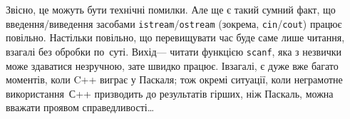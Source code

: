 Звісно, це можуть бути технічні помилки. Але ще є такий сумний факт, що введення/\nolinebreak[2]виведення засобами \texttt{istream}/\nolinebreak[2]\texttt{ostream} (зокрема, \texttt{cin}/\nolinebreak[2]\texttt{cout}) працює повільно. Настільки повільно, що перевищувати час буде саме лише читання, взагалі без обробки по~суті. Вихід\nolinebreak[3] --- читати функцією \texttt{scanf}, яка з незвички може здаватися незруч\-ною, зате швидко працює. І\nolinebreak[3] взагалі, є дуже вже багато моментів, коли C++ виграє у Паскаля; тож окремі ситуації, коли неграмотне використання~С++ призводить до результатів гірших, ніж Паскаль, можна вважати проявом справедливості\dots
